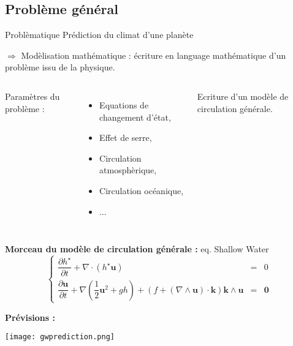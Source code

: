 \documentclass[11pt]{beamer}
\begin{document}
\subsection{Problème général}
\begin{frame}
\begin{block}{Problèmatique}
Prédiction du climat d'une planète

\begin{flushright}
$\Rightarrow$ Modèlisation mathématique : écriture en language mathématique d'un problème issu de la physique.
\end{flushright}

\pause
\end{block}

\vspace{0.8cm}
\begin{columns}
Paramètres du problème :
\begin{itemize}
\item Equations de changement d'état,
\item Effet de serre,
\item Circulation atmosphèrique,
\item Circulation océanique,
\item ...
\end{itemize}

\pause
{}
\begin{block}{}
Ecriture d'un modèle de circulation générale.
\end{block}
\end{columns}
\end{frame}

\begin{frame}
\textbf{Morceau du modèle de circulation générale :} eq. Shallow Water
\begin{equation}
\left\lbrace
\begin{array}{rcl}
\dfrac{\partial h^{\star}}{\partial t} + \nabla \cdot \left( h^{\star} \mathbf{u} \right) & = & 0 \\
\dfrac{\partial \mathbf{u}}{\partial t} + \nabla \left( \dfrac{1}{2} \mathbf{u}^2 + g h \right) + \left(f  + \left( \nabla \wedge \mathbf{u} \right) \cdot \mathbf{k}\right) \mathbf{k} \wedge \mathbf{u} & = & \mathbf{0}
\end{array}
\right.
\end{equation}

\pause
\textbf{Prévisions :}

\begin{center}
\texttt{[image: gwprediction.png]}
\end{center}
\end{frame}
\end{document}
